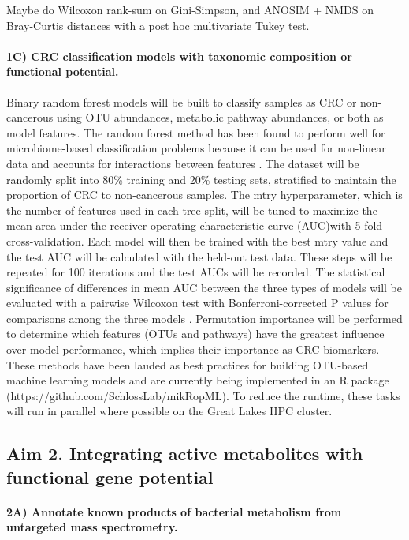 \documentclass[11pt]{article}
\begin{document}
Maybe do Wilcoxon rank-sum on Gini-Simpson, and ANOSIM + NMDS on Bray-Curtis distances with a post hoc multivariate Tukey test. \cite{hannigan_diagnostic_2018}

\paragraph{1C) CRC classification models with taxonomic composition or functional potential.}

Binary random forest models will be built to classify samples as CRC or non-cancerous using OTU abundances, metabolic pathway abundances, or both as model features.
The random forest method has been found to perform well for microbiome-based classification problems because it can be used for non-linear data and accounts for interactions between features \cite{baxter_microbiota-based_2016}.
The dataset will be randomly split into 80\% training and 20\% testing sets, stratified to maintain the proportion of CRC to non-cancerous samples.
The mtry hyperparameter, which is the number of features used in each tree split, will be tuned to maximize the mean area under the receiver operating characteristic curve (AUC)with 5-fold cross-validation.
Each model will then be trained with the best mtry value and the test AUC will be calculated with the held-out test data.
These steps will be repeated for 100 iterations and the test AUCs will be recorded.
The statistical significance of differences in mean AUC between the three types of models will be evaluated with a pairwise Wilcoxon test with Bonferroni-corrected P values for comparisons among the three models \cite{hannigan_diagnostic_2018}.
Permutation importance will be performed to determine which features (OTUs and pathways) have the greatest influence over model performance, which implies their importance as CRC biomarkers.
These methods have been lauded as best practices for building OTU-based machine learning models \cite{topcuoglu_framework_2020} and are currently being implemented in an R package (https://github.com/SchlossLab/mikRopML).
To reduce the runtime, these tasks will run in parallel where possible on the Great Lakes HPC cluster.

\subsection*{Aim 2. Integrating active metabolites with functional gene potential}

\paragraph{2A) Annotate known products of bacterial metabolism from untargeted mass spectrometry.}
\end{document}
